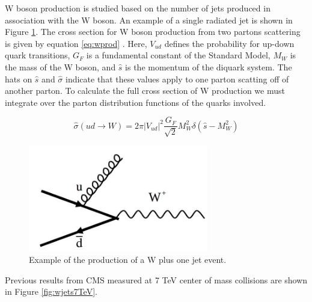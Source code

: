 \documentclass[oneside, letterpaper, oldfontcommands]{memoir}
\begin{document}
\qquad W boson production is studied based on the number of jets produced in association with the W boson. An example of a single radiated jet is shown in Figure \ref{fig:WOneJet}. The cross section for W boson production from two partons scattering is given by equation \ref{eq:wprod} \cite{Barger:0201058766}. Here, $V_{ud}$ defines the probability for up-down quark transitions, $G_{F}$ is a fundamental constant of the Standard Model, $M_{W}$ is the mass of the W boson, and $\hat{s}$ is the momentum of the diquark system. The hats on $\hat{s}$ and $\hat{\sigma}$ indicate that these values apply to one parton scatting off of another parton. To calculate the full cross section of W production we must integrate over the parton distribution functions of the quarks involved.

\begin{equation} \label{eq:wprod}
\hat{\sigma}(u d \rightarrow W) = 2\pi |V_{ud}|^{2}\frac{G_{F}}{\sqrt{2}}M_{W}^{2}\delta(\hat{s} - M_{W}^{2})
\end{equation}

\begin{figure}[here]
\includegraphics[width=0.7\textwidth]{WOneJet.jpg}
\caption{Example of the production of a W plus one jet event.}
\label{fig:WOneJet}
\end{figure}

Previous results from CMS measured at 7 TeV center of mass collisions\cite{Khachatryan:2014uva} are shown in Figure \ref{fig:wjets7TeV}. 
\end{document}
